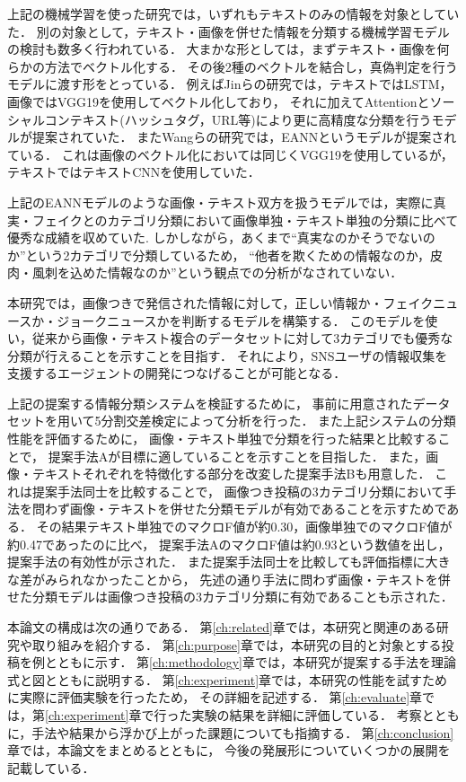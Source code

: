上記の機械学習を使った研究では，いずれもテキストのみの情報を対象としていた．
別の対象として，テキスト・画像を併せた情報を分類する機械学習モデルの検討も数多く行われている．
大まかな形としては，まずテキスト・画像を何らかの方法でベクトル化する．
その後2種のベクトルを結合し，真偽判定を行うモデルに渡す形をとっている．
例えばJinらの研究\cite{Jin:2017:MFR:3123266.3123454}では，テキストではLSTM，画像ではVGG19を使用してベクトル化しており，
それに加えてAttentionとソーシャルコンテキスト(ハッシュタグ，URL等)により更に高精度な分類を行うモデルが提案されていた．
またWangらの研究\cite{Wang:2018:EEA:3219819.3219903}では，EANNというモデルが提案されている．
これは画像のベクトル化においては同じくVGG19を使用しているが，テキストではテキストCNNを使用していた．

上記のEANNモデルのような画像・テキスト双方を扱うモデルでは，実際に真実・フェイクとのカテゴリ分類において画像単独・テキスト単独の分類に比べて優秀な成績を収めていた\cite{Wang:2018:EEA:3219819.3219903}.\@
しかしながら，あくまで``真実なのかそうでないのか''という2カテゴリで分類しているため，
``他者を欺くための情報なのか，皮肉・風刺を込めた情報なのか''という観点での分析がなされていない．

本研究では，画像つきで発信された情報に対して，正しい情報か・フェイクニュースか・ジョークニュースかを判断するモデルを構築する．
このモデルを使い，従来から画像・テキスト複合のデータセットに対して3カテゴリでも優秀な分類が行えることを示すことを目指す．
それにより，SNSユーザの情報収集を支援するエージェントの開発につなげることが可能となる．

上記の提案する情報分類システムを検証するために，
事前に用意されたデータセットを用いて5分割交差検定によって分析を行った．
また上記システムの分類性能を評価するために，
画像・テキスト単独で分類を行った結果と比較することで，
提案手法Aが目標に適していることを示すことを目指した．
また，画像・テキストそれぞれを特徴化する部分を改変した提案手法Bも用意した．
これは提案手法同士を比較することで，
画像つき投稿の3カテゴリ分類において手法を問わず画像・テキストを併せた分類モデルが有効であることを示すためである．
その結果テキスト単独でのマクロF値が約0.30，画像単独でのマクロF値が約0.47であったのに比べ，
提案手法AのマクロF値は約0.93という数値を出し，提案手法の有効性が示された．
また提案手法同士を比較しても評価指標に大きな差がみられなかったことから，
先述の通り手法に問わず画像・テキストを併せた分類モデルは画像つき投稿の3カテゴリ分類に有効であることも示された．

本論文の構成は次の通りである．
第\ref{ch:related}章では，本研究と関連のある研究や取り組みを紹介する．
第\ref{ch:purpose}章では，本研究の目的と対象とする投稿を例とともに示す．
第\ref{ch:methodology}章では，本研究が提案する手法を理論式と図とともに説明する．
第\ref{ch:experiment}章では，本研究の性能を試すために実際に評価実験を行ったため，
その詳細を記述する．
第\ref{ch:evaluate}章では，第\ref{ch:experiment}章で行った実験の結果を詳細に評価している．
考察とともに，手法や結果から浮かび上がった課題についても指摘する．
第\ref{ch:conclusion}章では，本論文をまとめるとともに，
今後の発展形についていくつかの展開を記載している．